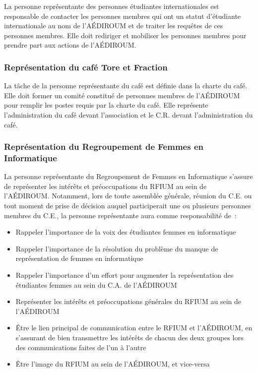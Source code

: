 \documentclass{aediroum}
\begin{document}
La personne représentante des personnes étudiantes internationales est responsable de contacter les personnes membres qui ont un statut d'étudiante internationale au nom de l'AÉDIROUM et de traiter les requêtes de ces personnes membres. Elle doit rediriger et mobiliser les personnes membres pour prendre part aux actions de l'AÉDIROUM.

\subsubsection{Représentation du café Tore et Fraction}\label{sec:representant-du-cafe-etudiant-math-info}

La tâche de la personne représentante du café est définie dans la charte du café. Elle doit former un comité constitué de personnes membres de l'AÉDIROUM pour remplir les postes requis par la charte du café. Elle représente l'administration du café devant l'association et le C.R. devant l'administration du café.

\subsubsection{Représentation du Regroupement de Femmes en Informatique}\label{sec:representant-e-regroupement-de-femmes-en-informatique}

La personne représentante du Regroupement de Femmes en Informatique s’assure de représenter les intérêts et préoccupations du RFIUM au sein de l’AÉDIROUM. Notamment, lors de toute assemblée générale, réunion du C.E. ou tout moment de prise de décision auquel participerait une ou plusieurs personnes membres du C.E., la personne représentante aura comme responsabilité de~:
\begin{itemize}
    \item Rappeler l'importance de la voix des étudiantes femmes en informatique
    \item Rappeler l'importance de la résolution du problème du manque de représentation de femmes en informatique
    \item Rappeler l'importance d'un effort pour augmenter la représentation des étudiantes femmes au sein du C.A. de l'AÉDIROUM
    \item Représenter les intérêts et préoccupations générales du RFIUM au sein de l'AÉDIROUM
    \item Être le lien principal de communication entre le RFIUM et l'AÉDIROUM, en s'assurant de bien transmettre les intérêts de chacun des deux groupes lors des communications faites de l'un à l'autre
    \item Être l'image du RFIUM au sein de l'AÉDIROUM, et vice-versa
\end{itemize}
\end{document}
